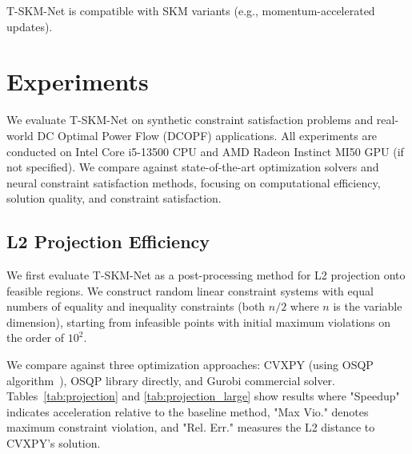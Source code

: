 \documentclass[letterpaper]{article} %
\begin{document}
T-SKM-Net is compatible with SKM variants (e.g., momentum-accelerated updates).

\section{Experiments}

We evaluate T-SKM-Net on synthetic constraint satisfaction problems and real-world DC Optimal Power Flow (DCOPF) applications. All experiments are conducted on Intel Core i5-13500 CPU and AMD Radeon Instinct MI50 GPU (if not specified). We compare against state-of-the-art optimization solvers and neural constraint satisfaction methods, focusing on computational efficiency, solution quality, and constraint satisfaction.

\subsection{L2 Projection Efficiency}

We first evaluate T-SKM-Net as a post-processing method for L2 projection onto feasible regions. We construct random linear constraint systems with equal numbers of equality and inequality constraints (both $n/2$ where $n$ is the variable dimension), starting from infeasible points with initial maximum violations on the order of $10^2$.

We compare against three optimization approaches: CVXPY (using OSQP algorithm~\cite{stellato2020osqp}), OSQP library directly, and Gurobi commercial solver. Tables~\ref{tab:projection} and \ref{tab:projection_large} show results where "Speedup" indicates acceleration relative to the baseline method, "Max Vio." denotes maximum constraint violation, and "Rel. Err." measures the L2 distance to CVXPY's solution.
\end{document}
